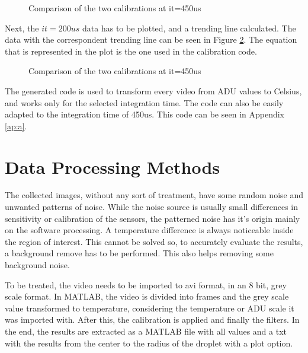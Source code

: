 \begin{figure}[h]
\centering

\caption{Comparison of the two calibrations at it=450us}
\label{fig:calibplot}
\end{figure}

\par Next, the $it=200us$ data has to be plotted, and a trending line calculated. The data with the correspondent trending line can be seen in Figure \ref{fig:calibcurve}. The equation that is represented in the plot is the one used in the calibration code. \\

\begin{figure}[h]
\centering

\caption{Comparison of the two calibrations at it=450us}
\label{fig:calibcurve}
\end{figure}

\par The generated code is used to transform every video from ADU values to Celsius, and works only for the selected integration time. The code can also be easily adapted to the integration time of 450us. This code can be seen in Appendix \ref{ap:a}. \\

\clearpage

\section{Data Processing Methods}
\par The collected images, without any sort of treatment, have some random noise and unwanted patterns of noise. While the noise source is usually small differences in sensitivity or calibration of the sensors, the patterned noise has it's origin mainly on the software processing. A temperature difference is always noticeable inside the region of interest. This cannot be solved so, to accurately evaluate the results, a background remove has to be performed. This also helps removing some background noise. \\

\par To be treated, the video needs to be imported to avi format, in an 8 bit, grey scale format. In MATLAB, the video is divided into frames and the grey scale value transformed to temperature, considering the temperature or ADU scale it was imported with. After this, the calibration is applied and finally the filters. In the end, the results are extracted as a MATLAB file with all values and a txt with the results from the center to the radius of the droplet with a plot option.

